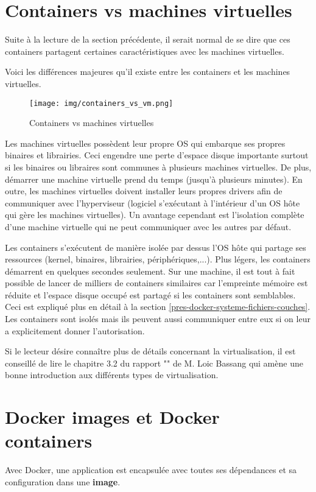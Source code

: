\section{Containers vs machines virtuelles}
Suite à la lecture de la section précédente, il serait normal de se dire que ces containers partagent certaines caractéristiques avec les machines virtuelles.

Voici les différences majeures qu'il existe entre les containers et les machines virtuelles.

\begin{figure}[hbtp]
\centering
\texttt{[image: img/containers\_vs\_vm.png]}
\caption{Containers vs machines virtuelles}
\end{figure}

Les machines virtuelles possèdent leur propre OS qui embarque ses propres binaires et librairies. Ceci engendre une perte d'espace disque importante surtout si les binaires ou libraires sont communes à plusieurs machines virtuelles. De plus, démarrer une machine virtuelle prend du temps (jusqu'à plusieurs minutes). En outre, les machines virtuelles doivent installer leurs propres drivers afin de communiquer avec l'hyperviseur (logiciel s'exécutant à l'intérieur d'un OS hôte qui gère les machines virtuelles). Un avantage cependant est l'isolation complète d'une machine virtuelle qui ne peut communiquer avec les autres par défaut.

Les containers s'exécutent de manière isolée par dessus l'OS hôte qui partage ses ressources (kernel, binaires, librairies, périphériques,...). Plus légers, les containers démarrent en quelques secondes seulement. Sur une machine, il est tout à fait possible de lancer de milliers de containers similaires car l'empreinte mémoire est réduite et l'espace disque occupé est partagé si les containers sont semblables. Ceci est expliqué plus en détail à la section \ref{pres-docker-systeme-fichiers-couches}. Les containers sont isolés mais ils peuvent aussi communiquer entre eux si on leur a explicitement donner l'autorisation.

Si le lecteur désire connaître plus de détails concernant la virtualisation, il est conseillé de lire le chapitre 3.2 du rapport "\bassangPrjSemestre" de M. Loic Bassang \cite{TODO} qui amène une bonne introduction aux différents types de virtualisation.


\section{Docker images et Docker containers}
Avec Docker, une application est encapsulée avec toutes ses dépendances et sa configuration dans une \textbf{image}. 

